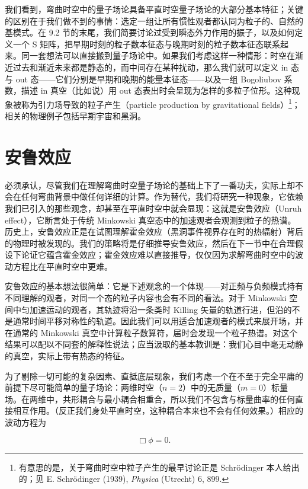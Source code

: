 我们看到，弯曲时空中的量子场论具备平直时空量子场论的大部分基本特征；关键的区别在于我们做不到的事情：选定一组让所有惯性观者都认同为粒子的、自然的基模式。在 9.2 节的末尾，我们简要讨论过受到瞬态外力作用的振子，以及如何定义一个 S 矩阵，把早期时刻的粒子数本征态与晚期时刻的粒子数本征态联系起来。同一套想法可以直接搬到量子场论中。如果我们考虑这样一种情形：时空在渐近过去和渐近未来都是静态的，而中间存在某种扰动，那么我们就可以定义 in 态与 out 态——它们分别是早期和晚期的能量本征态——以及一组 Bogoliubov 系数，描述 in 真空（比如说）用 out 态表出时会呈现为怎样的多粒子位形。这种现象被称为引力场导致的粒子产生（particle production by gravitational fields）\footnote{有意思的是，关于弯曲时空中粒子产生的最早讨论正是 Schrödinger 本人给出的；见 E. Schrödinger (1939), \emph{Physica} (Utrecht) 6, 899.}；相关的物理例子包括早期宇宙和黑洞。

\section{安鲁效应}

必须承认，尽管我们在理解弯曲时空量子场论的基础上下了一番功夫，实际上却不会在任何弯曲背景中做任何详细的计算。作为替代，我们将研究一种现象，它依赖我们已引入的那些观念，却甚至在平直时空中就会显现：这就是安鲁效应（Unruh effect），它断言处于传统 Minkowski 真空态中的加速观者会观测到粒子的热谱。历史上，安鲁效应正是在试图理解霍金效应（黑洞事件视界存在时的热辐射）背后的物理时被发现的。我们的策略将是仔细推导安鲁效应，然后在下一节中在合理假设下论证它蕴含霍金效应；霍金效应难以直接推导，仅仅因为求解弯曲时空中的波动方程比在平直时空中更难。

安鲁效应的基本想法很简单：它是下述观念的一个体现——对正频与负频模式持有不同理解的观者，对同一个态的粒子内容也会有不同的看法。对于 Minkowski 空间中匀加速运动的观者，其轨迹将沿一条类时 Killing 矢量的轨道行进，但沿的不是通常时间平移对称性的轨道。因此我们可以用适合加速观者的模式来展开场，并在通常的 Minkowski 真空中计算粒子数算符，届时会发现一个粒子热谱。对这个结果可以配以不同套的解释性说法；应当汲取的基本教训是：我们心目中毫无动静的真空，实际上带有热态的特征。

为了剔除一切可能的复杂因素、直抵底层现象，我们考虑一个在不至于完全平庸的前提下尽可能简单的量子场论：两维时空（$n=2$）中的无质量（$m=0$）标量场。在两维中，共形耦合与最小耦合相重合，所以我们不包含与标量曲率的任何直接相互作用。（反正我们身处平直时空，这种耦合本来也不会有任何效果。）相应的波动方程为

\begin{equation*}
\Box\phi = 0.
\tag{9.124}
\end{equation*}

